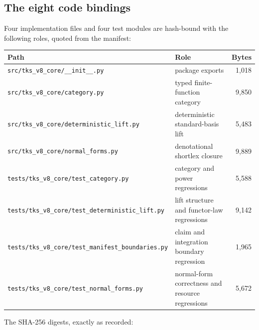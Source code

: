 \subsection{The eight code bindings}

Four implementation files and four test modules are hash-bound with the
following roles, quoted from the manifest:

\begin{center}
\small
\begin{tabular}{@{}lp{5.4cm}r@{}}
\toprule
Path & Role & Bytes \\
\midrule
\texttt{src/tks\_v8\_core/\_\_init\_\_.py} & package exports & 1{,}018 \\
\texttt{src/tks\_v8\_core/category.py} & typed finite-function category & 9{,}850 \\
\texttt{src/tks\_v8\_core/deterministic\_lift.py} & deterministic standard-basis lift & 5{,}483 \\
\texttt{src/tks\_v8\_core/normal\_forms.py} & denotational shortlex closure & 9{,}889 \\
\texttt{tests/tks\_v8\_core/test\_category.py} & category and power regressions & 5{,}588 \\
\texttt{tests/tks\_v8\_core/test\_deterministic\_lift.py} & lift structure and functor-law regressions & 9{,}142 \\
\texttt{tests/tks\_v8\_core/test\_manifest\_boundaries.py} & claim and integration boundary regression & 1{,}965 \\
\texttt{tests/tks\_v8\_core/test\_normal\_forms.py} & normal-form correctness and resource regressions & 5{,}672 \\
\bottomrule
\end{tabular}
\end{center}

The SHA-256 digests, exactly as recorded:

